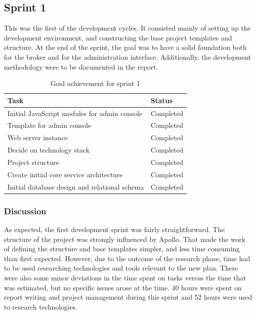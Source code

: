 \subsection{Sprint 1}
\label{subsec:project_lifecycle-development-sprint_1}

This was the first of the development cycles. It consisted mainly of setting up the development environment, and constructing the base project templates and structure. At the end of the sprint, the goal was to have a solid foundation both for the broker and for the administration interface. Additionally, the development methodology were to be documented in the report.

\begin{center}
\begin{table}[H]
\small
\centering
\begin{tabular}{|p{10cm}|p{2cm}|}
\hline
\rowcolor{lightgray}
 \textbf{Task} & \textbf{Status} \\
\hline
\rowcolor{green!30}
 Initial JavaScript modules for admin console & Completed  \\
 \rowcolor{green!30}
 Template for admin console & Completed \\ 
 \rowcolor{green!30}
 Web server instance & Completed \\ 
 \rowcolor{green!30}
 Decide on technology stack & Completed \\ 
 \rowcolor{green!30}
 Project structure & Completed \\
 \rowcolor{green!30}
 Create initial core service architecture & Completed \\
 \rowcolor{green!30}
 Initial database design and relational schema & Completed \\
\hline
\end{tabular}
\caption{Goal achievement for sprint 1}
\label{tab:sprint 1, goals}
\end{table}
\end{center}


\subsubsection{Discussion}
\label{subsec:project_lifecycle-development-sprint_1-discussion}

As expected, the first development sprint was fairly straightforward. The structure of the project was strongly influenced by Apollo. That made the work of defining the structure and base templates simpler, and less time consuming than first expected. However, due to the outcome of the research phase, time had to be used researching technologies and tools relevant to the new plan. There were also some minor deviations in the time spent on tasks versus the time that was estimated, but no specific issues arose at the time. 40 hours were spent on report writing and project management during this sprint and 52 hours were used to research technologies.

